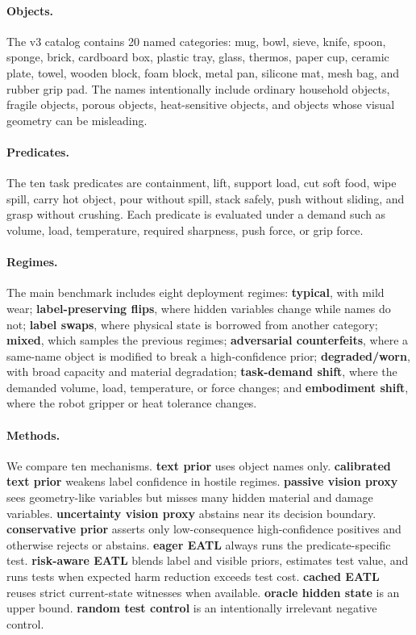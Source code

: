 \documentclass{article}
\begin{document}
\paragraph{Objects.}
The v3 catalog contains 20 named categories: mug, bowl, sieve, knife, spoon,
sponge, brick, cardboard box, plastic tray, glass, thermos, paper cup, ceramic
plate, towel, wooden block, foam block, metal pan, silicone mat, mesh bag, and
rubber grip pad.  The names intentionally include ordinary household objects,
fragile objects, porous objects, heat-sensitive objects, and objects whose
visual geometry can be misleading.

\paragraph{Predicates.}
The ten task predicates are containment, lift, support load, cut soft food, wipe
spill, carry hot object, pour without spill, stack safely, push without sliding,
and grasp without crushing.  Each predicate is evaluated under a demand such as
volume, load, temperature, required sharpness, push force, or grip force.

\paragraph{Regimes.}
The main benchmark includes eight deployment regimes:
\textbf{typical}, with mild wear;
\textbf{label-preserving flips}, where hidden variables change while names do
not;
\textbf{label swaps}, where physical state is borrowed from another category;
\textbf{mixed}, which samples the previous regimes;
\textbf{adversarial counterfeits}, where a same-name object is modified to
break a high-confidence prior;
\textbf{degraded/worn}, with broad capacity and material degradation;
\textbf{task-demand shift}, where the demanded volume, load, temperature, or
force changes; and
\textbf{embodiment shift}, where the robot gripper or heat tolerance changes.

\paragraph{Methods.}
We compare ten mechanisms.  \textbf{text prior} uses object names only.
\textbf{calibrated text prior} weakens label confidence in hostile regimes.
\textbf{passive vision proxy} sees geometry-like variables but misses many
hidden material and damage variables.  \textbf{uncertainty vision proxy}
abstains near its decision boundary.  \textbf{conservative prior} asserts only
low-consequence high-confidence positives and otherwise rejects or abstains.
\textbf{eager EATL} always runs the predicate-specific test.
\textbf{risk-aware EATL} blends label and visible priors, estimates test value,
and runs tests when expected harm reduction exceeds test cost.
\textbf{cached EATL} reuses strict current-state witnesses when available.
\textbf{oracle hidden state} is an upper bound.  \textbf{random test control}
is an intentionally irrelevant negative control.
\end{document}
